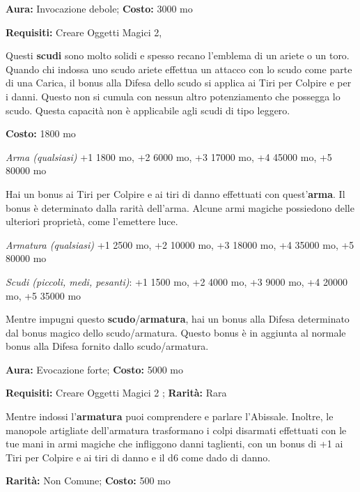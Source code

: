 \begin{multicols}{2}

\textbf{Aura:} Invocazione debole; \textbf{Costo:} 3000 mo

\textbf{Requisiti:} Creare Oggetti Magici 2,

Questi \textbf{scudi} sono molto solidi e spesso recano l'emblema di un ariete o un toro. Quando chi indossa uno scudo ariete effettua un attacco con lo scudo come parte di una Carica, il bonus alla Difesa dello scudo si applica ai Tiri per Colpire e per i danni. Questo non si cumula con nessun altro potenziamento che possegga lo scudo. Questa capacità non è applicabile agli scudi di tipo leggero.


\textbf{Costo:} 1800 mo

\emph{Arma (qualsiasi)} +1 1800 mo, +2 6000 mo, +3 17000 mo, +4 45000 mo, +5 80000 mo

Hai un bonus ai Tiri per Colpire e ai tiri di danno effettuati con quest'\textbf{arma}. Il bonus è determinato dalla rarità dell'arma. Alcune armi magiche possiedono delle ulteriori proprietà, come l'emettere luce.


\emph{Armatura (qualsiasi)} +1 2500 mo, +2 10000 mo, +3 18000 mo, +4 35000 mo, +5 80000 mo

\emph{Scudi (piccoli, medi, pesanti)}: +1 1500 mo, +2 4000 mo, +3 9000 mo, +4 20000 mo, +5 35000 mo

Mentre impugni questo \textbf{scudo}/\textbf{armatura}, hai un bonus alla Difesa determinato dal bonus magico dello scudo/armatura. Questo bonus è in aggiunta al normale bonus alla Difesa fornito dallo scudo/armatura.


\textbf{Aura:} Evocazione forte; \textbf{Costo:} 5000 mo

\textbf{Requisiti:} Creare Oggetti Magici 2 ; \textbf{Rarità:} Rara

Mentre indossi l'\textbf{armatura} puoi comprendere e parlare l'Abissale. Inoltre, le manopole artigliate dell'armatura trasformano i colpi disarmati effettuati con le tue mani in armi magiche che infliggono danni taglienti, con un bonus di +1 ai Tiri per Colpire e ai tiri di danno e il d6 come dado di danno.


\textbf{Rarità:} Non Comune; \textbf{Costo:} 500 mo


\end{multicols}
